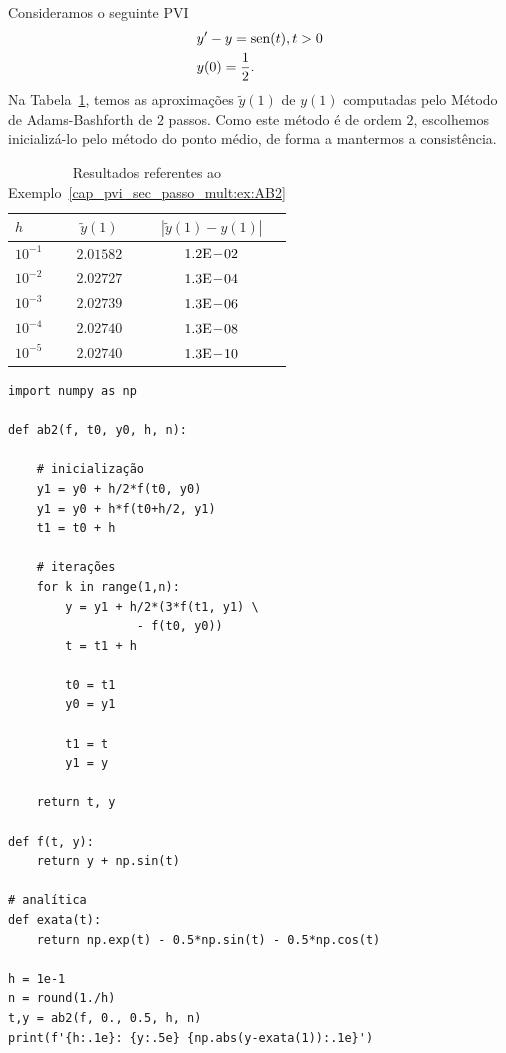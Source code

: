 \begin{ex}\label{cap_pvi_sec_passo_mult:ex:AB2}
  Consideramos o seguinte PVI
  \begin{subequations}
    \begin{align}
      &y' - y = \operatorname{sen}(t), t>0\\
      &y(0) = \frac{1}{2}.
    \end{align}
  \end{subequations}
  Na Tabela~\ref{cap_pvi_sec_passo_mult:tab:ex_AB2}, temos as aproximações $\tilde{y}(1)$ de $y(1)$ computadas pelo Método de Adams-Bashforth de $2$ passos. Como este método é de ordem $2$, escolhemos inicializá-lo pelo método do ponto médio, de forma a mantermos a consistência.
 
  \begin{table}[H]
    \centering
    \caption{Resultados referentes ao Exemplo~\ref{cap_pvi_sec_passo_mult:ex:AB2}}
    \begin{tabular}{l|cc}
      $h$ & $\tilde{y}(1)$ & $|\tilde{y}(1)-y(1)|$\\\hline
      $10^{-1}$ & $2.01582$ & $1.2\mathrm{E}\!-\!02$ \\
      $10^{-2}$ & $2.02727$ & $1.3\mathrm{E}\!-\!04$ \\
      $10^{-3}$ & $2.02739$ & $1.3\mathrm{E}\!-\!06$ \\
      $10^{-4}$ & $2.02740$ & $1.3\mathrm{E}\!-\!08$ \\
      $10^{-5}$ & $2.02740$ & $1.3\mathrm{E}\!-\!10$ \\\hline
    \end{tabular}
    \label{cap_pvi_sec_passo_mult:tab:ex_AB2}
  \end{table}

\begin{lstlisting}[caption=abs2.py]
import numpy as np

def ab2(f, t0, y0, h, n):

    # inicialização
    y1 = y0 + h/2*f(t0, y0)
    y1 = y0 + h*f(t0+h/2, y1)
    t1 = t0 + h

    # iterações
    for k in range(1,n):
        y = y1 + h/2*(3*f(t1, y1) \
                  - f(t0, y0))
        t = t1 + h
        
        t0 = t1
        y0 = y1
        
        t1 = t
        y1 = y
        
    return t, y

def f(t, y):
    return y + np.sin(t)

# analítica
def exata(t):
    return np.exp(t) - 0.5*np.sin(t) - 0.5*np.cos(t)

h = 1e-1
n = round(1./h)
t,y = ab2(f, 0., 0.5, h, n)
print(f'{h:.1e}: {y:.5e} {np.abs(y-exata(1)):.1e}')
\end{lstlisting}
\end{ex}


